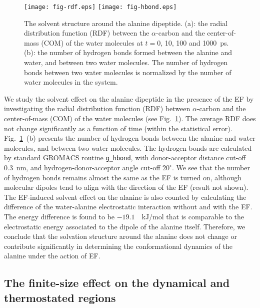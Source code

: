 \documentclass[a4paper,preprint,unsortedaddress,onecolumn]{revtex4-1}
\newcommand{\recheck}[1]{{\color{red} #1}}
\begin{document}
\begin{figure}
  \centering
  \texttt{[image: fig-rdf.eps]}
  \texttt{[image: fig-hbond.eps]}
  \caption{The solvent structure around the alanine dipeptide.  
    (a): the radial distribution function (RDF) between the
    $\alpha$-carbon and the center-of-mass (COM) of the water molecules at
    $t = 0$, 10, 100 and 1000~ps.  (b): the number of hydrogen
    bonds formed between the alanine and water, and between two water
    molecules.  The number of hydrogen bonds between two water
    molecules is normalized by the number of water molecules in the
    system. 
  }
  \label{fig:tmp7a}
\end{figure}
We study the solvent effect on the alanine dipeptide in the presence of the EF by investigating
the radial distribution function (RDF) between $\alpha$-carbon and the
center-of-mass (COM) of the water molecules
(see Fig.~\ref{fig:tmp7a}). The average
RDF does not change significantly as a function of time
(within the statistical error). 
Fig.~\ref{fig:tmp7a}~(b) presents the number of hydrogen bonds between the
alanine and water molecules, and between two water molecules.
\recheck{The hydrogen bonds are calculated by standard GROMACS
routine {\texttt {g\_hbond}}, with donor-acceptor distance cut-off 0.3~nm,
and hydrogen-donor-acceptor angle cut-off $20^{\circ}$.}
We see that the
number of hydrogen bonds remains almost the same as the EF is turned on,
although molecular dipoles tend to align with the direction of the EF (result
not shown). 
The EF-induced solvent effect on the alanine is also counted by calculating the
difference of the water-alanine electrostatic interaction 
without and with the EF.
The energy difference is found to be $-19.1$~~kJ/mol that is
comparable to the electrostatic energy associated to the dipole of the alanine itself.
Therefore, we conclude that the solvation structure around the
alanine does not change or contribute significantly in determining the conformational dynamics of the alanine under the action of EF.






\subsection{The finite-size effect on the dynamical and thermostated regions}
\end{document}
